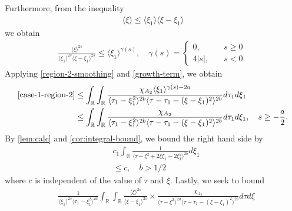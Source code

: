 \documentclass[12pt,reqno]{amsart}
\numberwithin{equation}{section}  %
\numberwithin{figure}{section}
\newcommand{\rr}{\mathbb{R}}
\theoremstyle{plain}
\theoremstyle{definition}
\theoremstyle{remark}
\begin{document}
%
%
Furthermore, from the inequality
%
%
\begin{equation*}
\begin{split}
  \langle \xi \rangle  \le \langle \xi_{1} \rangle \langle \xi - \xi_{1} \rangle 
\end{split}
\end{equation*}
%
we obtain
%
%
\begin{equation}
  \label{growth-term}
\begin{split}
  \frac{\langle \xi \rangle ^{2s}}{\langle \xi_{1} \rangle ^{2s} \langle \xi -
  \xi_{1} \rangle ^{2s}} \le \langle \xi_{1} \rangle ^{\gamma(s)},
  \quad 
  \gamma(s) = 
  \begin{cases} 0, \quad & s \ge 0
    \\
    4|s|, \quad & s < 0.
  \end{cases}
\end{split}
\end{equation}
Applying \eqref{region-2-smoothing} and \eqref{growth-term}, we obtain 
%
%
\begin{equation*}
\begin{split}
  \eqref{case-1-region-2}
  & \le 
  \int_{\rr} \int_{\rr}  \frac{\chi_{A_{2}} \langle \xi_{1} \rangle
  ^{\gamma(s) -2a}}{ 
  \langle \tau_{1} - \xi_{1}^{2} \rangle^{2b} \langle  \tau - \tau_{1} -
    (\xi - \xi_{1})^{2} \rangle^{2b} }
    d \tau_1 d \xi_{1}
    \\
    & \le \int_{\rr} \int_{\rr}  \frac{\chi_{A_{2}}}{ 
    \langle \tau_{1} - \xi_{1}^{2} \rangle^{2b} \langle  \tau - \tau_{1} -
    (\xi - \xi_{1})^{2} \rangle^{2b} }
    d \tau_1 d \xi_{1}, \quad s \ge -\frac{a}{2}.
  \end{split}
\end{equation*}
%
%
By \autoref{lem:calc} and \autoref{cor:integral-bound}, we bound the right hand
side by
%
%
\begin{equation*}
\begin{split}
  & c_{1} \int_{\rr}  \frac{1}{\langle \tau - \xi^{2} + 2 \xi \xi_{1} - 2
  \xi_{1}^{2} \rangle ^{2b}}d \xi_{1}
  \\
  & \le  c, \quad b > 1/2
\end{split}
\end{equation*}
%
%
where $c$ is independent of the value of $\tau$ and $\xi$. 
%
Lastly, we seek to bound
\begin{equation*}
\begin{split}
  &  \frac{1}{\langle \xi_{1} \rangle ^{2s}
  \langle \tau_{1} - \xi_{1}^{2}  \rangle
  ^{2a}} \int_{\rr} \int_{\rr} \frac{\langle \xi \rangle ^{2s}}{\langle
  \xi - \xi_{1}\rangle ^{2s}}  \times \frac{\chi_{A_{3}}}{\langle
  \tau - \xi^{2} \rangle ^{2a} \langle \tau - \tau_{1} - (\xi -
  \xi_{1})^{2} \rangle ^{2b}} d \tau d \xi
\end{split}
\end{equation*}
\end{document}
